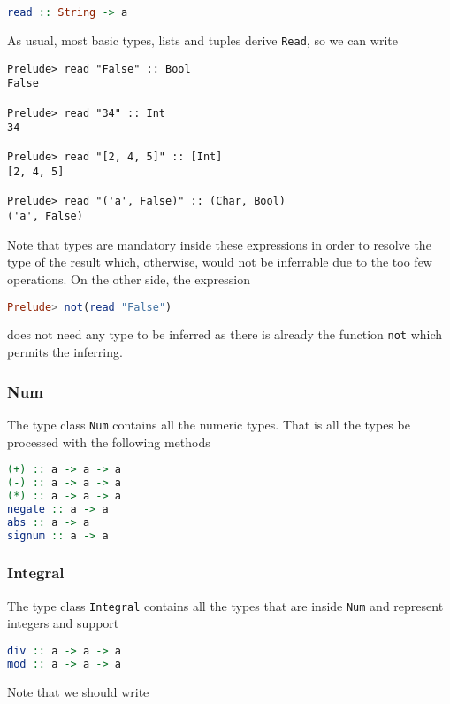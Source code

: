 \begin{lstlisting}[language=haskell]
read :: String -> a
\end{lstlisting}

As usual, most basic types, lists and tuples derive \texttt{Read}, so we can write

\begin{lstlisting}
Prelude> read "False" :: Bool
False

Prelude> read "34" :: Int
34

Prelude> read "[2, 4, 5]" :: [Int]
[2, 4, 5]

Prelude> read "('a', False)" :: (Char, Bool)
('a', False)
\end{lstlisting}

Note that types are mandatory inside these expressions in order to resolve the type of the result which, otherwise, would not be inferrable due to the too few operations. On the other side, the expression 

\begin{lstlisting}[language=haskell]
Prelude> not(read "False")
\end{lstlisting}

does not need any type to be inferred as there is already the function \texttt{not} which permits the inferring. 


\subsubsection{Num}
The type class \texttt{Num} contains all the numeric types. That is all the types be processed with the following methods

\begin{lstlisting}[language=haskell]
(+) :: a -> a -> a
(-) :: a -> a -> a
(*) :: a -> a -> a
negate :: a -> a
abs :: a -> a
signum :: a -> a
\end{lstlisting}


\subsubsection{Integral}
The type class \texttt{Integral} contains all the types that are inside \texttt{Num} and represent integers and support

\begin{lstlisting}[language=haskell]
div :: a -> a -> a
mod :: a -> a -> a
\end{lstlisting}

Note that we should write 

